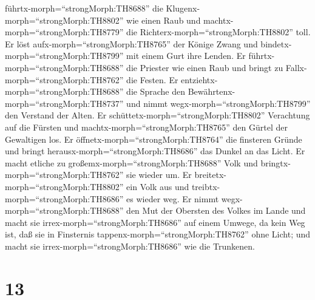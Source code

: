 führtx-morph=``strongMorph:TH8688'' die
Klugenx-morph=``strongMorph:TH8802'' wie einen Raub und
machtx-morph=``strongMorph:TH8779'' die
Richterx-morph=``strongMorph:TH8802'' toll.  Er löst
aufx-morph=``strongMorph:TH8765'' der Könige Zwang und
bindetx-morph=``strongMorph:TH8799'' mit einem Gurt ihre Lenden.
 Er führtx-morph=``strongMorph:TH8688'' die Priester wie
einen Raub und bringt zu Fallx-morph=``strongMorph:TH8762'' die Festen.
 Er entziehtx-morph=``strongMorph:TH8688'' die Sprache den
Bewährtenx-morph=``strongMorph:TH8737'' und nimmt
wegx-morph=``strongMorph:TH8799'' den Verstand der Alten. 
Er schüttetx-morph=``strongMorph:TH8802'' Verachtung auf die Fürsten und
machtx-morph=``strongMorph:TH8765'' den Gürtel der Gewaltigen los.
 Er öffnetx-morph=``strongMorph:TH8764'' die finsteren
Gründe und bringt herausx-morph=``strongMorph:TH8686'' das Dunkel an das
Licht.  Er macht etliche zu
großemx-morph=``strongMorph:TH8688'' Volk und
bringtx-morph=``strongMorph:TH8762'' sie wieder um. Er
breitetx-morph=``strongMorph:TH8802'' ein Volk aus und
treibtx-morph=``strongMorph:TH8686'' es wieder weg.  Er
nimmt wegx-morph=``strongMorph:TH8688'' den Mut der Obersten des Volkes
im Lande und macht sie irrex-morph=``strongMorph:TH8686'' auf einem
Umwege, da kein Weg ist,  daß sie in Finsternis
tappenx-morph=``strongMorph:TH8762'' ohne Licht; und macht sie
irrex-morph=``strongMorph:TH8686'' wie die Trunkenen.

\hypertarget{section-12}{%
\section{13}\label{section-12}}

